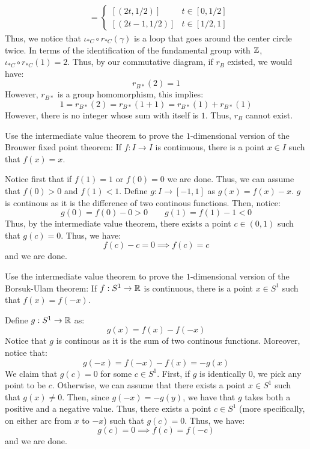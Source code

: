 \documentclass[12pt]{article}
\begin{document}
\begin{solution}
\begin{enumerate}
\begin{align*}
            &= \begin{cases}
                [(2t, 1/2)] & t \in [0, 1/2] \\
                [(2t-1, 1/2)] & t \in [1/2, 1]
            \end{cases}
        \end{align*} 
        Thus, we notice that $\iota_{*C} \circ r_{*C}(\gamma)$ is a loop that goes around the center circle twice. In terms of the identification of the fundamental group with $\mathbb Z$, $\iota_{*C}\circ r_{*C}(1) = 2$. Thus, by our commutative diagram, if $r_B$ existed, we would have:
        \[ r_{B*}(2) = 1\]
        However, $r_{B*}$ is a group homomorphism, this implies: 
        \[ 1 = r_{B*}(2) = r_{B*}(1+1) = r_{B*}(1)+r_{B*}(1) \] 
        However, there is no integer whose sum with itself is $1$. Thus, $r_B$ cannot exist.
    \end{enumerate}
\end{solution}
\newpage

\begin{problem}{4}
    Use the intermediate value theorem to prove the $1$-dimensional version of the Brouwer fixed point theorem: If $f \colon I \to I$ is continuous, there is a point $x \in I$ such that $f(x) = x$. 
\end{problem}
\begin{solution}
    Notice first that if $f(1) = 1$ or $f(0) = 0$ we are done. Thus, we can assume that $f(0) > 0$ and $f(1) < 1$. Define $g: I \to [-1, 1]$ as $g(x) = f(x) - x$. $g$ is continous as it is the difference of two continous functions. Then, notice: 
    \[g(0) = f(0)-0 > 0 \qquad g(1) = f(1) - 1 < 0 \] 
    Thus, by the intermediate value theorem, there exists a point $c \in (0, 1)$ such that $g(c) = 0$. Thus, we have:
    \[f(c) - c = 0 \implies f(c) = c\] 
    and we are done.
\end{solution}
\newpage

\begin{problem}{5}
    Use the intermediate value theorem to prove the $1$-dimensional version of the Borsuk-Ulam theorem: If $f: S^1 \to \mathbb R$ is continuous, there is a point $x \in S^1$ such that $f(x) = f(-x)$.
\end{problem}
\begin{solution}
    Define $g: S^1 \to \mathbb R$ as:
    \[ g(x) = f(x) - f(-x)\]
    Notice that $g$ is continous as it is the sum of two continous functions. Moreover, notice that: 
    \[ g(-x) = f(-x)-f(x) = -g(x)\]
    We claim that $g(c) = 0$ for some $c \in S^1$. First, if $g$ is identically $0$, we pick any point to be $c$. Otherwise, we can assume that there exists a point $x \in S^1$ such that $g(x) \neq 0$. Then, since $g(-x) = -g(y)$, we have that $g$ takes both a positive and a negative value. Thus, there exists a point $c \in S^1$ (more specifically, on either arc from $x$ to $-x$) such that $g(c) = 0$. Thus, we have:
    \[g(c) = 0 \implies f(c) = f(-c)\]
    and we are done. 
\end{solution}
\end{document}
